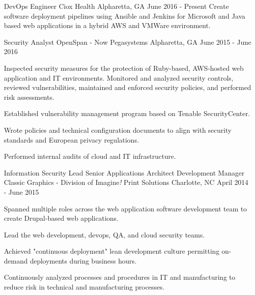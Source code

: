 


\begin{cventries}


\cventry
{DevOps Engineer}
{Ciox Health}
{Alpharetta, GA}
{June 2016 - Present}
{ %
Create software deployment pipelines using Ansible and Jenkins for Microsoft and Java based web applications in a hybrid AWS and VMWare environment.
}


\cventry
{Security Analyst}
{OpenSpan - Now Pegasystems}
{Alpharetta, GA}
{June 2015 - June 2016}
{ %
Inspected security measures for the protection of Ruby-based, AWS-hosted web application and IT environments. Monitored and analyzed security controls, reviewed vulnerabilities, maintained and enforced security policies, and performed risk assessments.
\begin{cvitems}
\item[]
\item {Established vulnerability management program based on Tenable SecurityCenter.}
\item {Wrote policies and technical configuration documents to align with security standards and European privacy regulations.}
\item {Performed internal audits of cloud and IT infrastructure.}
\end{cvitems}
}


\cventry
{Information Security Lead\newline
Senior Applications Architect\newline
Development Manager}
{Classic Graphics - Division of Imagine{\it !} Print Solutions} %
{Charlotte, NC} %
{April 2014 - June 2015} %
{
Spanned multiple roles across the web application software development team to create Drupal-based web applications.
\begin{cvitems}
\item[]
\item {Lead the web development, devops, QA, and cloud security teams.}
\item {Achieved "continuous deployment" lean development culture permitting on-demand deployments during business hours.}
\item {Continuously analyzed processes and procedures in IT and manufacturing to reduce risk in technical and manufacturing processes.}
\end{cvitems}
}


\end{cventries}

